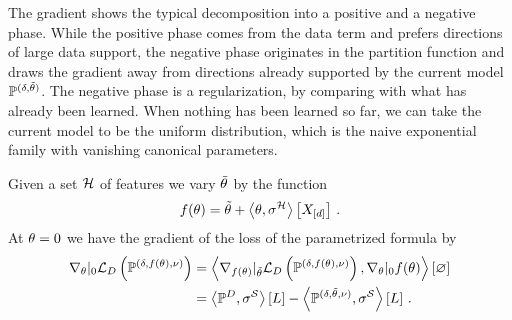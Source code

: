 

The gradient shows the typical decomposition into a positive and a negative phase.
While the positive phase comes from the data term and prefers directions of large data support, the negative phase originates in the partition function and draws the gradient away from directions already supported by the current model $\mathbb{P}^{(\delta, \tilde{\theta})}$.
The negative phase is a regularization, by comparing with what has already been learned.
When nothing has been learned so far, we can take the current model to be the uniform distribution, which is the naive exponential family with vanishing canonical parameters.



Given a set $\mathcal{H}$ of features we vary $\tilde{\theta}$ by the function
\begin{align*}
	 f(\theta) = \tilde{\theta} + \left\langle \theta,\sigma^{\mathcal{H}}\right\rangle \left[ X_{[d]} \right] \, .
\end{align*}
At $\theta=0$ we have the gradient of the loss of the parametrized formula by
\begin{align*}
	 \nabla_{\theta}|_{0}
	 \mathcal{L}_{D}\left(\mathbb{P}^{(\delta,f(\theta),\nu)}\right)
	 &= \left\langle 
	 	 \nabla_{f(\theta)}|_{\tilde{\theta}}  \mathcal{L}_{D}\left(\mathbb{P}^{(\delta,f(\theta),\nu)}\right),
		 \nabla_{\theta}|_{0}  f(\theta)
	 \right\rangle \left[ \varnothing \right]  \\
	 &= \left\langle \mathbb{P}^{D},\sigma^{\mathcal{S}}\right\rangle \left[ L \right] -   \left\langle \mathbb{P}^{(\delta, \tilde{\theta}, \nu)},\sigma^{\mathcal{S}}\right\rangle \left[ L \right] \, .
\end{align*}


